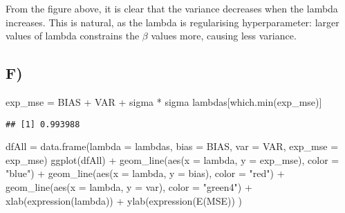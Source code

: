 \documentclass[
]{article}
\newenvironment{Shaded}{\begin{snugshade}}{\end{snugshade}}
\newcommand{\AttributeTok}[1]{\textcolor[rgb]{0.77,0.63,0.00}{#1}}
\newcommand{\FunctionTok}[1]{\textcolor[rgb]{0.00,0.00,0.00}{#1}}
\newcommand{\NormalTok}[1]{#1}
\newcommand{\OtherTok}[1]{\textcolor[rgb]{0.56,0.35,0.01}{#1}}
\newcommand{\SpecialCharTok}[1]{\textcolor[rgb]{0.00,0.00,0.00}{#1}}
\newcommand{\StringTok}[1]{\textcolor[rgb]{0.31,0.60,0.02}{#1}}
\begin{document}
From the figure above, it is clear that the variance decreases when the
lambda increases. This is natural, as the lambda is regularising
hyperparameter: larger values of lambda constrains the \(\beta\) values
more, causing less variance.

\hypertarget{f}{%
\subsection{F)}\label{f}}

\begin{Shaded}
\begin{Highlighting}[]
\NormalTok{exp\_mse }\OtherTok{=}\NormalTok{ BIAS }\SpecialCharTok{+}\NormalTok{ VAR }\SpecialCharTok{+}\NormalTok{ sigma }\SpecialCharTok{*}\NormalTok{ sigma}
\NormalTok{lambdas[}\FunctionTok{which.min}\NormalTok{(exp\_mse)]}
\end{Highlighting}
\end{Shaded}

\begin{verbatim}
## [1] 0.993988
\end{verbatim}

\begin{Shaded}
\begin{Highlighting}[]
\NormalTok{dfAll }\OtherTok{=} \FunctionTok{data.frame}\NormalTok{(}\AttributeTok{lambda =}\NormalTok{ lambdas, }\AttributeTok{bias =}\NormalTok{ BIAS, }\AttributeTok{var =}\NormalTok{ VAR, }\AttributeTok{exp\_mse =}\NormalTok{ exp\_mse)}
\FunctionTok{ggplot}\NormalTok{(dfAll) }\SpecialCharTok{+} \FunctionTok{geom\_line}\NormalTok{(}\FunctionTok{aes}\NormalTok{(}\AttributeTok{x =}\NormalTok{ lambda, }\AttributeTok{y =}\NormalTok{ exp\_mse), }\AttributeTok{color =} \StringTok{"blue"}\NormalTok{) }\SpecialCharTok{+}
  \FunctionTok{geom\_line}\NormalTok{(}\FunctionTok{aes}\NormalTok{(}\AttributeTok{x =}\NormalTok{ lambda, }\AttributeTok{y =}\NormalTok{ bias), }\AttributeTok{color =} \StringTok{"red"}\NormalTok{) }\SpecialCharTok{+}
  \FunctionTok{geom\_line}\NormalTok{(}\FunctionTok{aes}\NormalTok{(}\AttributeTok{x =}\NormalTok{ lambda, }\AttributeTok{y =}\NormalTok{ var), }\AttributeTok{color =} \StringTok{"green4"}\NormalTok{) }\SpecialCharTok{+}
  \FunctionTok{xlab}\NormalTok{(}\FunctionTok{expression}\NormalTok{(lambda)) }\SpecialCharTok{+}
  \FunctionTok{ylab}\NormalTok{(}\FunctionTok{expression}\NormalTok{(}\FunctionTok{E}\NormalTok{(MSE))}
\NormalTok{)}
\end{Highlighting}
\end{Shaded}
\end{document}
